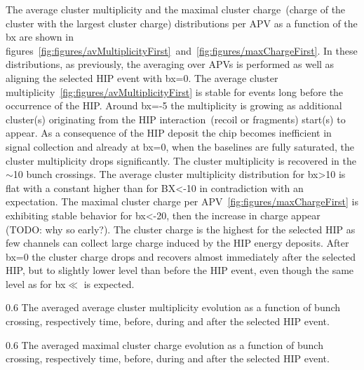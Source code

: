 The average cluster multiplicity and the maximal cluster charge~(charge of the cluster with the largest cluster charge) distributions per APV as a function of the bx are shown in figures~\ref{fig:figures/avMultiplicityFirst}~and~\ref{fig:figures/maxChargeFirst}. In these distributions, as previously, the averaging over APVs is performed as well as aligning the selected HIP event with bx=0. The average cluster multiplicity~\ref{fig:figures/avMultiplicityFirst} is stable for events long before the occurrence of the HIP. Around bx=-5 the multiplicity is growing as additional cluster(s) originating from the HIP interaction~(recoil or fragments) start(s) to appear. As a consequence of the HIP deposit the chip becomes inefficient in signal collection and already at bx=0, when the baselines are fully saturated, the cluster multiplicity drops significantly. The cluster multiplicity is recovered in the $\sim$10 bunch crossings. The average cluster multiplicity distribution for bx>10 is flat with a constant higher than for BX<-10 in contradiction with an expectation. The maximal cluster charge per APV~\ref{fig:figures/maxChargeFirst} is exhibiting stable behavior for bx<-20, then the increase in charge appear (TODO: why so early?). The cluster charge is the highest for the selected HIP as few channels can collect large charge induced by the HIP energy deposits. After bx=0 the cluster charge drops and recovers almost immediately after the selected HIP, but to slightly lower level than before the HIP event, even though the same level as for bx$\ll$ is expected. 



                 {0.6}       %
                 {The averaged average cluster multiplicity evolution as a function of bunch crossing, respectively time, before, during and after the selected HIP event. } %

                 {0.6}       %
                 {The averaged maximal cluster charge evolution as a function of bunch crossing, respectively time, before, during and after the selected HIP event. } %

